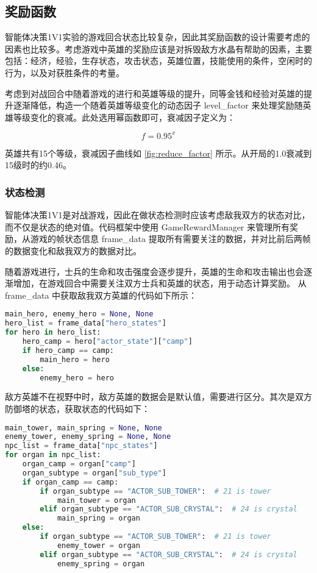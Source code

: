 \subsection{奖励函数}


智能体决策1V1实验的游戏回合状态比较复杂，因此其奖励函数的设计需要考虑的因素也比较多。考虑游戏中英雄的奖励应该是对拆毁敌方水晶有帮助的因素，主要包括：经济，经验，生存状态，攻击状态，英雄位置，技能使用的条件，空闲时的行为，以及对获胜条件的考量。


考虑到对战回合中随着游戏的进行和英雄等级的提升，同等金钱和经验对英雄的提升逐渐降低，构造一个随着英雄等级变化的动态因子 level\_factor 来处理奖励随英雄等级变化的衰减。此处选用幂函数即可，衰减因子定义为：

\begin{equation}
    f = 0.95^{x}
\end{equation}

英雄共有15个等级，衰减因子曲线如 \cref{fig:reduce_factor} 所示。从开局的1.0衰减到15级时的约0.46。

\subsubsection{状态检测}

智能体决策1V1是对战游戏，因此在做状态检测时应该考虑敌我双方的状态对比，而不仅是状态的绝对值。代码框架中使用 GameRewardManager 来管理所有奖励，从游戏的帧状态信息 frame\_data 提取所有需要关注的数据，并对比前后两帧的数据变化和敌我双方的数据对比。


随着游戏进行，士兵的生命和攻击强度会逐步提升，英雄的生命和攻击输出也会逐渐增加，在游戏回合中需要关注双方士兵和英雄的状态，用于动态计算奖励。
从 frame\_data 中获取敌我双方英雄的代码如下所示：

\begin{lstlisting}[language=Python]
main_hero, enemy_hero = None, None
hero_list = frame_data["hero_states"]
for hero in hero_list:
    hero_camp = hero["actor_state"]["camp"]
    if hero_camp == camp:
        main_hero = hero
    else:
        enemy_hero = hero
\end{lstlisting}

敌方英雄不在视野中时，敌方英雄的数据会是默认值，需要进行区分。其次是双方防御塔的状态，获取状态的代码如下：

\begin{lstlisting}[language=Python]
main_tower, main_spring = None, None
enemy_tower, enemy_spring = None, None
npc_list = frame_data["npc_states"]
for organ in npc_list:
    organ_camp = organ["camp"]
    organ_subtype = organ["sub_type"]
    if organ_camp == camp:
        if organ_subtype == "ACTOR_SUB_TOWER":  # 21 is tower
            main_tower = organ
        elif organ_subtype == "ACTOR_SUB_CRYSTAL":  # 24 is crystal
            main_spring = organ
    else:
        if organ_subtype == "ACTOR_SUB_TOWER":  # 21 is tower
            enemy_tower = organ
        elif organ_subtype == "ACTOR_SUB_CRYSTAL":  # 24 is crystal
            enemy_spring = organ
\end{lstlisting}

